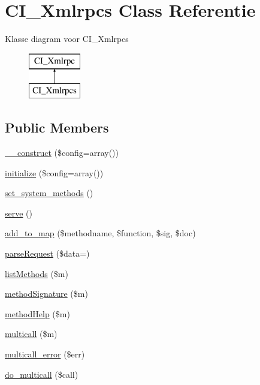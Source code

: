 \hypertarget{class_c_i___xmlrpcs}{}\section{C\+I\+\_\+\+Xmlrpcs Class Referentie}
\label{class_c_i___xmlrpcs}
Klasse diagram voor C\+I\+\_\+\+Xmlrpcs\begin{figure}[H]
\begin{center}
\leavevmode
\includegraphics[height=2.000000cm]{class_c_i___xmlrpcs}
\end{center}
\end{figure}
\subsection*{Public Members}
\begin{DoxyCompactItemize}
\item 
\mbox{\hyperlink{class_c_i___xmlrpcs_af7f9493844d2d66e924e3c1df51ce616}{\+\_\+\+\_\+construct}} (\$config=array())
\item 
\mbox{\hyperlink{class_c_i___xmlrpcs_a481385e36d920f5a5005ace05c6cd016}{initialize}} (\$config=array())
\item 
\mbox{\hyperlink{class_c_i___xmlrpcs_a858a05529612358b8f63c88b08b414d0}{set\+\_\+system\+\_\+methods}} ()
\item 
\mbox{\hyperlink{class_c_i___xmlrpcs_aa9e0b443b9575f62bf9f8e85b1742c96}{serve}} ()
\item 
\mbox{\hyperlink{class_c_i___xmlrpcs_a73b29191620c55a5e2d3fda3a5c3cf44}{add\+\_\+to\+\_\+map}} (\$methodname, \$function, \$sig, \$doc)
\item 
\mbox{\hyperlink{class_c_i___xmlrpcs_a8a0c34554b9238be766ab85f55519b6e}{parse\+Request}} (\$data=\textquotesingle{}\textquotesingle{})
\item 
\mbox{\hyperlink{class_c_i___xmlrpcs_ad640f0b44d1956a05cfe40bab4e4043d}{list\+Methods}} (\$m)
\item 
\mbox{\hyperlink{class_c_i___xmlrpcs_a9f96cc0bd3338094174eb22cd90d6f2a}{method\+Signature}} (\$m)
\item 
\mbox{\hyperlink{class_c_i___xmlrpcs_a97626f30e860f4a63463f8674827dc00}{method\+Help}} (\$m)
\item 
\mbox{\hyperlink{class_c_i___xmlrpcs_a122ce829a1aa3f0041f922ec5feb95c8}{multicall}} (\$m)
\item 
\mbox{\hyperlink{class_c_i___xmlrpcs_a4cf545e6c15e1487b223346b18ca017d}{multicall\+\_\+error}} (\$err)
\item 
\mbox{\hyperlink{class_c_i___xmlrpcs_ab76189ac2d65f1e3ab6d65128e3748d5}{do\+\_\+multicall}} (\$call)
\end{DoxyCompactItemize}
